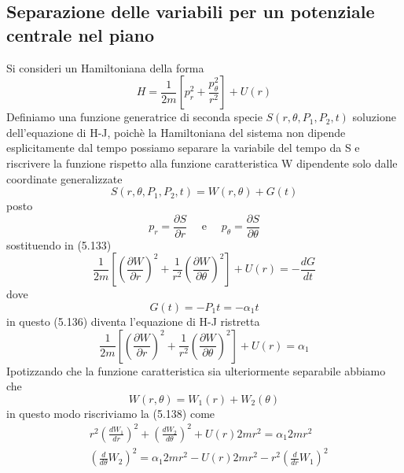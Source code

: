 \subsection{Separazione delle variabili per un potenziale centrale nel piano}

Si consideri un Hamiltoniana della forma 
\begin{equation}
H=\frac{1}{2 m}\left[p^{2}_r+\frac{p^{2}_{\theta}}{r^2}\right]+U(r)
\end{equation}
Definiamo una funzione generatrice di seconda specie $S(r,\theta,P_1,P_2,t)$ soluzione dell'equazione di H-J, poich\`{e} la Hamiltoniana del sistema non dipende esplicitamente dal tempo possiamo separare la variabile del tempo da S e riscrivere la funzione rispetto alla funzione caratteristica W dipendente solo dalle coordinate generalizzate
\begin{equation}
S\left(r, \theta, P_1, P_2, t\right)=W(r, \theta) + G(t)
\end{equation}
posto
\begin{equation}
p_r=\frac{\partial S}{\partial r} \quad \text { e } \quad p_\theta=\frac{\partial S}{\partial \theta}
\end{equation}
sostituendo in (5.133)
\begin{equation}
\frac{1}{2 m}\left[\left(\frac{\partial W}{\partial r}\right)^2+\frac{1}{r^2}\left(\frac{\partial W}{\partial \theta}\right)^2\right]+U(r)=-\frac{d G}{d t}
\end{equation}
dove 
\begin{equation}
	G(t) = -P_1t = - \alpha_1t
\end{equation}
in questo (5.136) diventa l'equazione di H-J ristretta
\begin{equation}
\frac{1}{2 m}\left[\left(\frac{\partial W}{\partial r}\right)^2+\frac{1}{r^2}\left(\frac{\partial W}{\partial \theta}\right)^2\right]+U(r)= \alpha_1
\end{equation}
Ipotizzando che la funzione caratteristica sia ulteriormente separabile abbiamo che 
\begin{equation}
	W(r, \theta)=W_1(r)+W_2(\theta)
\end{equation}
in questo modo riscriviamo la (5.138) come 
\begin{equation}
\begin{aligned}
& r^2\left(\frac{d W_1}{d r}\right)^2+\left(\frac{d W_2}{d \theta}\right)^2+U(r) 2 m r^2=\alpha_1 2 m r^2 \\[0.2in]
& \left(\frac{d}{d \theta} W_2\right)^2=\alpha_{1}2 m r^2-U(r) 2 m r^2-r^2\left(\frac{d}{d r} W_1\right)^2
\end{aligned}
\end{equation}
